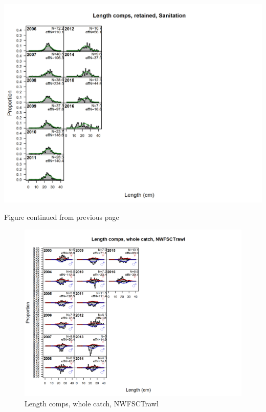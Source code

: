 \documentclass[12pt,]{article}
\begin{document}
\includegraphics{./r4ss/plots_mod1/comp_lenfit_flt7mkt2_page2.png}

\begin{center} 

              Figure continued from previous page 

             \end{center}

\begin{figure}[htbp]
\centering
\includegraphics{./r4ss/plots_mod1/comp_lenfit_flt8mkt0.png}
\caption{Length comps, whole catch, NWFSCTrawl
\label{fig:mod1_10_comp_lenfit_flt8mkt0}}
\end{figure}
\end{document}
